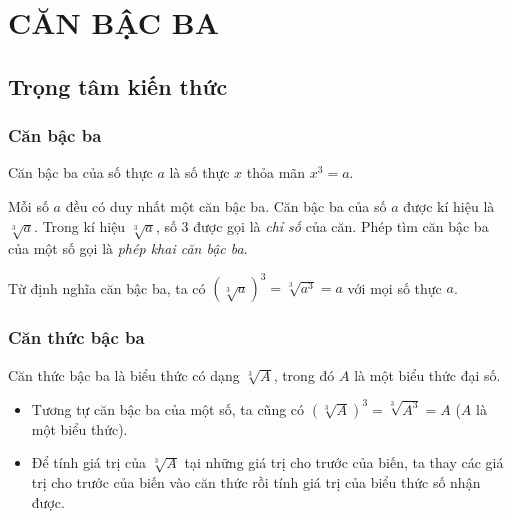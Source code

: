 \setcounter{section}{1}
\section{CĂN BẬC BA}
\subsection{Trọng tâm kiến thức}
\begin{tomtat}
\subsubsection{Căn bậc ba}
\begin{boxdn}
	Căn bậc ba của số thực $a$ là số thực $x$ thỏa mãn $x^3=a$.
\end{boxdn}
\begin{note}
	Mỗi số $a$ đều có duy nhất một căn bậc ba. Căn bậc ba của số $a$ được kí hiệu là $\sqrt[3]{a}$. Trong kí hiệu $\sqrt[3]{a}$, số $3$ được gọi là \textit{chỉ số} của căn. Phép tìm căn bậc ba của một số gọi là \textit{phép khai căn bậc ba}.
\end{note}
\begin{nx}
	Từ định nghĩa căn bậc ba, ta có $\left(\sqrt[3]{a}\right)^3=\sqrt[3]{a^3}=a$ với mọi số thực $a$.
\end{nx}
\subsubsection{Căn thức bậc ba}
\begin{boxdn}
	Căn thức bậc ba là biểu thức có dạng $\sqrt[3]{A}$, trong đó $A$ là một biểu thức đại số.
\end{boxdn}
\begin{note}
	\begin{itemize}
	\item Tương tự căn bậc ba của một số, ta cũng có $\left(\sqrt[3]{A}\right)^3=\sqrt[3]{A^3}=A$ ($A$ là một biểu thức).
	\item Để tính giá trị của $\sqrt[3]{A}$ tại những giá trị cho trước của biến, ta thay các giá trị cho trước của biến vào căn thức rồi tính giá trị của biểu thức số nhận được.
	\end{itemize}
\end{note}
\end{tomtat}
